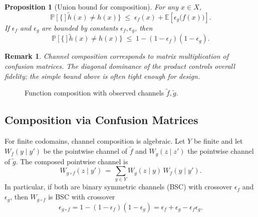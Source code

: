 \documentclass[11pt,final,hidelinks]{article}
\newtheorem{proposition}[theorem]{Proposition}
\newtheorem{remark}[theorem]{Remark}
\newcommand{\obs}[1]{\widetilde{#1}}  %
\newcommand{\Prob}[1]{\mathbb{P}\left[#1\right]}
\newcommand{\Expect}[1]{\mathbb{E}\left[#1\right]}
\newcommand{\error}{\epsilon}
\begin{document}
\begin{proposition}[Union bound for composition]
For any $x\in X$,
\begin{equation}
\Prob\{\obs{h}(x)\neq h(x)\} \;\le\; \error_f(x) + \Expect{\error_g\bigl(f(x)\bigr)}.
\end{equation}
If $\error_f$ and $\error_g$ are bounded by constants $\epsilon_f,\epsilon_g$, then
\begin{equation}
\Prob\{\obs{h}(x)\neq h(x)\} \;\le\; 1-(1-\epsilon_f)(1-\epsilon_g).
\end{equation}
\end{proposition}

\begin{remark}
Channel composition corresponds to matrix multiplication of confusion matrices. The diagonal dominance of the product controls overall fidelity; the simple bound above is often tight enough for design.
\end{remark}

\begin{figure}[t]
\centering
{}
\caption{Function composition with observed channels $\obs{f},\obs{g}$.}
\end{figure}

\subsection{Composition via Confusion Matrices}

For finite codomains, channel composition is algebraic. Let $Y$ be finite and let $W_f(y\mid y')$ be the pointwise channel of $\obs{f}$ and $W_g(z\mid z')$ the pointwise channel of $\obs{g}$. The composed pointwise channel is
\begin{equation}
    W_{g\circ f}(z\mid y') \,=\, \sum_{y\in Y} W_g(z\mid y)\,W_f(y\mid y').
\end{equation}
In particular, if both are binary symmetric channels (BSC) with crossover $\epsilon_f$ and $\epsilon_g$, then $W_{g\circ f}$ is BSC with crossover
\begin{equation}
    \epsilon_{g\circ f} = 1-(1-\epsilon_f)(1-\epsilon_g) = \epsilon_f+\epsilon_g-\epsilon_f\epsilon_g.
\end{equation}
\end{document}
